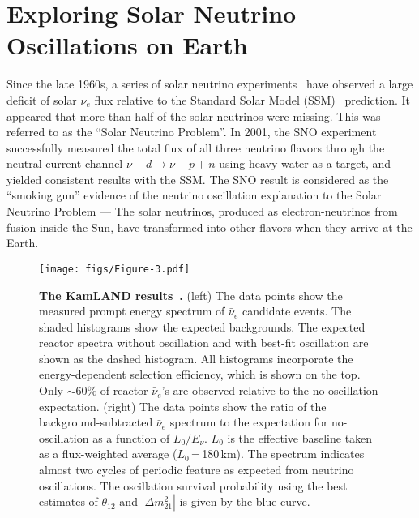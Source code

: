 \documentclass[aps,twocolumn,preprintnumbers,amsmath,superscriptaddress,amssymb,floats,nofootinbib]{revtex4-1}
\begin{document}
\vspace{10pt}

\twocolumngrid


\section{Exploring Solar Neutrino Oscillations on Earth} 
\label{sec:kamland}

Since the late 1960s, a series of solar neutrino experiments~\cite{Homestake,GALLEX,SAGE,Kamiokande,Super-Kamiokande} have observed a large deficit of solar $\nu_e$ flux relative to the Standard Solar Model (SSM)~\cite{Bahcall} prediction. 
It appeared that more than half of the solar neutrinos were missing. 
This was referred to as the ``Solar Neutrino Problem''. 
In 2001, the SNO experiment~\cite{SNO} successfully measured the total flux of all three neutrino flavors through the neutral current channel $\nu + d \to \nu + p + n$ using heavy water as a target, and yielded consistent results with the SSM. 
The SNO result is considered as the ``smoking gun'' evidence of the neutrino oscillation explanation to the Solar Neutrino Problem --- The solar neutrinos, produced as electron-neutrinos from fusion inside the Sun, have transformed into other flavors when they arrive at the Earth.

\begin{figure*}[htb] \label{fig:kamland}
  \centering
  \texttt{[image: figs/Figure-3.pdf]}
  \caption{{\bf The KamLAND results~\cite{Kamland08}.} (left) The data points show the measured prompt energy spectrum of $\bar\nu_e$ candidate events. The shaded histograms show the expected backgrounds. The expected reactor spectra without oscillation and with best-fit oscillation are shown as the dashed histogram. All histograms incorporate the energy-dependent selection efficiency, which is shown on the top. Only $\sim$60\% of reactor $\bar\nu_e$'s are observed relative to the no-oscillation expectation. 
  (right) The data points show the ratio of the background-subtracted
  $\bar\nu_e$ spectrum to the expectation for no-oscillation as a
  function of $L_{0}/E_{\nu}$. $L_{0}$ is the effective baseline taken as a
  flux-weighted average ($L_{0}$\,=\,180\,km). The spectrum indicates almost two cycles of periodic feature as expected from neutrino oscillations. The oscillation survival probability using the best estimates of $\theta_{12}$ and $|\Delta{m}^2_{21}|$ is given by the blue curve.}
\end{figure*}
\end{document}
